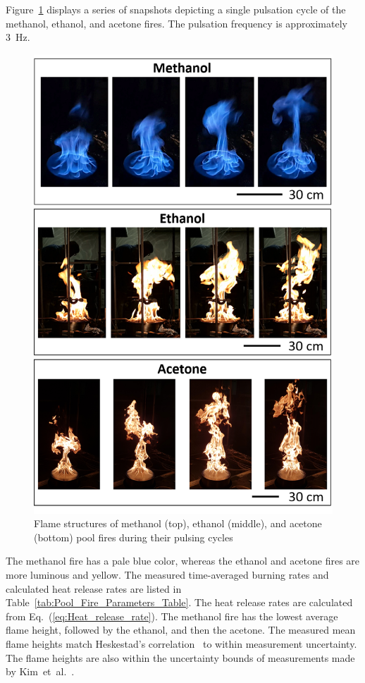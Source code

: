 \documentclass[12pt]{article}
\begin{document}
Figure~\ref{fig:Flame_Structure} displays a series of snapshots depicting a single pulsation cycle of the methanol, ethanol, and acetone fires. The pulsation frequency is approximately 3~Hz.
\begin{figure}[p]
	\centering
\includegraphics[width=5.0in,keepaspectratio]{Flame_Structure.png}
	\caption[Photographs of the three fires]{Flame structures of methanol (top), ethanol (middle), and acetone (bottom) pool fires during their pulsing cycles}
	\label{fig:Flame_Structure}
\end{figure}
The methanol fire has a pale blue color, whereas the ethanol and acetone fires are more luminous and yellow. The measured time-averaged burning rates and calculated heat release rates are listed in Table~\ref{tab:Pool_Fire_Parameters_Table}. The heat release rates are calculated from Eq.~(\ref{eq:Heat_release_rate}). The methanol fire has the lowest average flame height, followed by the ethanol, and then the acetone. The measured mean flame heights match Heskestad’s correlation~\cite{Heskestad1983} to within measurement uncertainty. The flame heights are also within the uncertainty bounds of measurements made by Kim~et~al.~\cite{Kim2019}.
\end{document}

